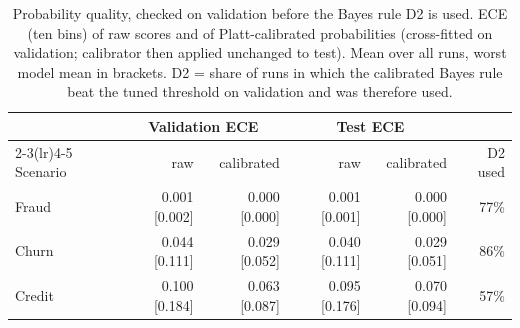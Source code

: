 \begin{table}[t]
\centering
\caption{Probability quality, checked on validation before the Bayes rule D2 is used. ECE (ten bins) of raw scores and of Platt-calibrated probabilities (cross-fitted on validation; calibrator then applied unchanged to test). Mean over all runs, worst model mean in brackets. D2 = share of runs in which the calibrated Bayes rule beat the tuned threshold on validation and was therefore used.}
\label{tab:calibration}
\scriptsize
\setlength{\tabcolsep}{2.2pt}
\begin{tabular}{lrrrrr}
\toprule
 & \multicolumn{2}{c}{Validation ECE} & \multicolumn{2}{c}{Test ECE} & \\
\cmidrule(lr){2-3}\cmidrule(lr){4-5}
Scenario & raw & calibrated & raw & calibrated & D2 used \\ \midrule
Fraud & 0.001 [0.002] & 0.000 [0.000] & 0.001 [0.001] & 0.000 [0.000] & 77\% \\
Churn & 0.044 [0.111] & 0.029 [0.052] & 0.040 [0.111] & 0.029 [0.051] & 86\% \\
Credit & 0.100 [0.184] & 0.063 [0.087] & 0.095 [0.176] & 0.070 [0.094] & 57\% \\
\bottomrule
\end{tabular}
\end{table}
